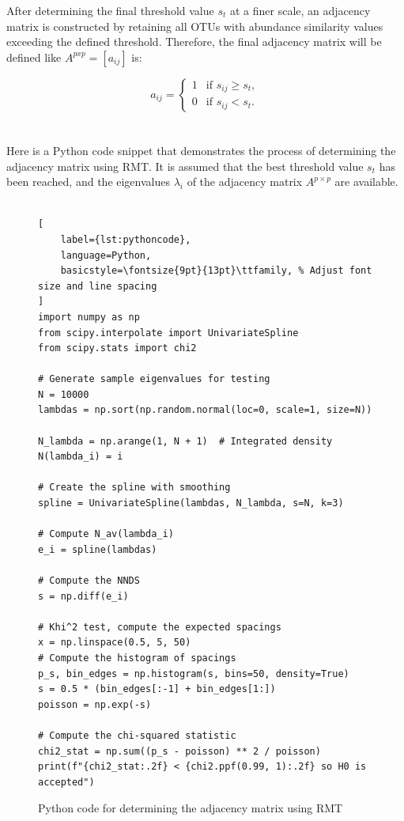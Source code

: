 \noindent After determining the final threshold value $s_t$ at a finer scale, an adjacency matrix is constructed by retaining all OTUs with abundance similarity values exceeding the defined threshold.
Therefore, the final adjacency matrix will be defined like $A^{pxp}=[a_{ij}]$ is:

\[a_{ij} =
\begin{cases}
1 & \text{if } s_{ij} \geq s_t, \\
0 & \text{if } s_{ij} < s_t.
\end{cases}\]
\\\\
\noindent Here is a Python code snippet that demonstrates the process of determining the adjacency matrix using RMT.
It is assumed that the best threshold value $s_t$ has been reached, and the eigenvalues $\lambda_i$ of the adjacency matrix $A^{p \times p}$ are available.
\\\\
\begin{figure}[H] %
\centering
\begin{lstlisting}[
    label={lst:pythoncode},
    language=Python,
    basicstyle=\fontsize{9pt}{13pt}\ttfamily, % Adjust font size and line spacing
]
import numpy as np
from scipy.interpolate import UnivariateSpline
from scipy.stats import chi2

# Generate sample eigenvalues for testing
N = 10000
lambdas = np.sort(np.random.normal(loc=0, scale=1, size=N))

N_lambda = np.arange(1, N + 1)  # Integrated density N(lambda_i) = i

# Create the spline with smoothing
spline = UnivariateSpline(lambdas, N_lambda, s=N, k=3)

# Compute N_av(lambda_i)
e_i = spline(lambdas)

# Compute the NNDS
s = np.diff(e_i)

# Khi^2 test, compute the expected spacings
x = np.linspace(0.5, 5, 50)
# Compute the histogram of spacings
p_s, bin_edges = np.histogram(s, bins=50, density=True)
s = 0.5 * (bin_edges[:-1] + bin_edges[1:])
poisson = np.exp(-s)

# Compute the chi-squared statistic
chi2_stat = np.sum((p_s - poisson) ** 2 / poisson)
print(f"{chi2_stat:.2f} < {chi2.ppf(0.99, 1):.2f} so H0 is accepted")
\end{lstlisting}
\caption{Python code for determining the adjacency matrix using RMT}
\label{fig:pythoncode}
\end{figure}

